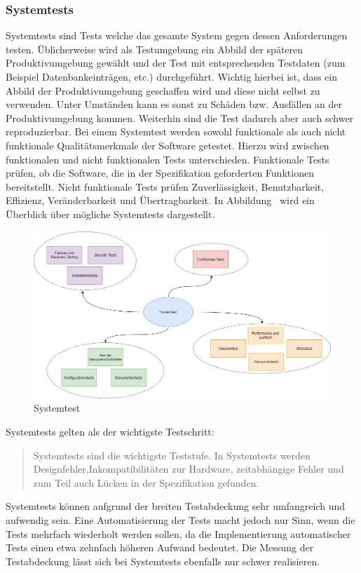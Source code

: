\subsubsection{Systemtests}
Systemtests sind Tests welche das gesamte System gegen dessen Anforderungen testen. Üblicherweise wird als Testumgebung ein Abbild der späteren Produktivumgebung gewählt und der Test mit entsprechenden Testdaten (zum Beispiel Datenbankeinträgen, etc.) durchgeführt. Wichtig hierbei ist, dass ein Abbild der Produktivumgebung geschaffen wird und diese nicht selbst zu verwenden. Unter Umständen kann es sonst zu Schäden bzw. Ausfällen an der Produktivumgebung kommen. Weiterhin sind die Test dadurch aber auch schwer reproduzierbar. Bei einem Systemtest werden sowohl funktionale als auch nicht funktionale Qualitätsmerkmale der Software getestet\cite{Witte.2016}. Hierzu wird zwischen funktionalen und nicht funktionalen Tests unterschieden. Funktionale Tests prüfen, ob die Software, die in der Spezifikation geforderten Funktionen bereitstellt. Nicht funktionale Tests prüfen Zuverlässigkeit, Benutzbarkeit, Effizienz, Veränderbarkeit und Übertragbarkeit. In Abbildung \dq {}\dq~wird ein Überblick über mögliche Systemtests dargestellt.\newline
\begin{figure}[h]
	\centering
  \includegraphics[width=1\textwidth]{img/Systemtest.jpg} 
   \caption{Systemtest}
  \label{fig:Systemtest.jpg}
\end{figure}
\cleardoublepage
Systemtests gelten als der wichtigste Testschritt: \begin{quote}\dq Systemtests sind die wichtigste Teststufe. In Systemtests werden Designfehler,Inkompatibilitäten zur Hardware, zeitabhängige Fehler und zum Teil auch Lücken in der Spezifikation gefunden.\dq~ ~\cite[S.~195]{Grunfelder.2017}\end{quote} Systemtests können aufgrund der breiten Testabdeckung sehr umfangreich und aufwendig sein. Eine Automatisierung der Tests macht jedoch nur Sinn, wenn die Tests mehrfach wiederholt werden sollen, da die Implementierung automatischer Tests einen etwa zehnfach höheren Aufwand bedeutet\cite{Basler.2016}. Die Messung der Testabdeckung lässt sich bei Systemtests ebenfalls nur schwer realisieren. \cite{Grunfelder.2017}

